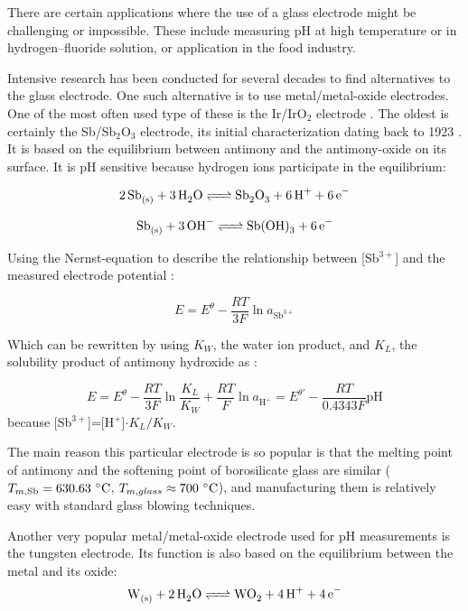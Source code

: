\documentclass[manuscript=article, journal=jceda8]{achemso}
\begin{document}
There are certain applications where the use of a glass electrode might be challenging or impossible.
These include measuring pH at high temperature or in hydrogen--fluoride solution, or application in the food industry. 

Intensive research has been conducted for several decades to find alternatives to the glass electrode. One such alternative is to use metal/metal-oxide electrodes.
One of the most often used type of these is the Ir/IrO$_2$ electrode \cite{beyenal2004improved}.
The oldest is certainly the Sb/Sb$_2$O$_3$ electrode, its initial characterization dating back to 1923 \cite{uhl1923electrometric}.
It is based on the equilibrium between antimony and the antimony-oxide on its surface.
It is pH sensitive because hydrogen ions participate in the equilibrium:

\begin{equation}
        \ce{2Sb_{(s)} + 3H_2O <=> Sb_2O_3 + 6H^+ + 6e^-}
\end{equation}

\begin{equation}
        \ce{Sb_{(s)} + 3OH^- <=> Sb(OH)_3 + 6e^-}
\end{equation}

Using the Nernst-equation to describe the relationship between [Sb$^{3+}$] and the measured electrode potential \cite{kurzweil2009metal}:

\begin{equation}
E = E^\theta - \frac{RT}{3F}\ln a_{\textrm{Sb}^{3+}}
\end{equation}

Which can be rewritten by using $K_W$, the water ion product, and $K_L$, the solubility product of antimony hydroxide as \cite{kurzweil2009metal}:

\begin{equation}
E = E^\theta - \frac{RT}{3F}\ln \frac{K_L}{K_W} + \frac{RT}{F}\ln a_{\textrm{H}^+}
= E^{\theta '} - \frac{RT}{0.4343F} \textrm{pH}  
\end{equation}
because [Sb$^{3+}$]=[H$^+$]$\cdot K_L / K_W$.

The main reason this particular electrode is so popular is that the melting point of antimony and the softening point of borosilicate glass are similar ($T_{m, \textrm{Sb}} = 630.63~\celsius$, $T_{m, glass}\approx 700~\celsius$), and manufacturing them is relatively easy with standard glass blowing techniques.

Another very popular metal/metal-oxide electrode used for pH measurements is the tungsten electrode. Its function is also based on the equilibrium between the metal and its oxide:
\begin{equation}
        \ce{W_{(s)} + 2H_2O <=> WO_2 + 4H^+ + 4e^-}
\end{equation}
\end{document}
